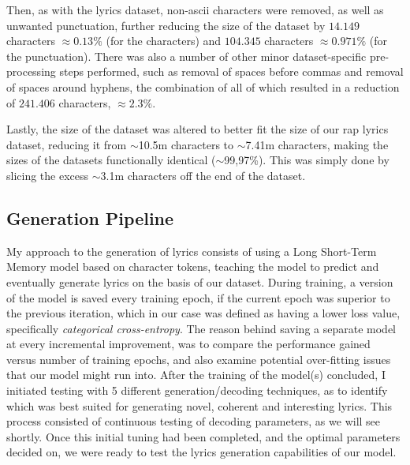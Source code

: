 Then, as with the lyrics dataset, non-ascii characters were removed, as well as unwanted punctuation, further reducing the size of the dataset by $14.149$ characters $\approx0.13\%$ (for the characters) and $104.345$ characters $\approx0.971\%$ (for the punctuation). There was also a number of other minor dataset-specific pre-processing steps performed, such as removal of spaces before commas and removal of spaces around hyphens, the combination of all of which resulted in a reduction of $241.406$ characters, $\approx2.3\%$.

Lastly, the size of the dataset was altered to better fit the size of our rap lyrics dataset, reducing it from $\sim$10.5m characters to $\sim$7.41m characters, making the sizes of the datasets functionally identical ($\sim$99,97\%). This was simply done by slicing the excess $\sim$3.1m characters off the end of the dataset.

\subsection{Generation Pipeline}
\label{sec:generation-pipeline}

My approach to the generation of lyrics consists of using a Long Short-Term Memory model based on character tokens, teaching the model to predict and eventually generate lyrics on the basis of our dataset. During training, a version of the model is saved every training epoch, if the current epoch was superior to the previous iteration, which in our case was defined as having a lower loss value, specifically \textit{categorical cross-entropy}. The reason behind saving a separate model at every incremental improvement, was to compare the performance gained versus number of training epochs, and also examine potential over-fitting issues that our model might run into.
After the training of the model(s) concluded, I initiated testing with 5 different generation/decoding techniques, as to identify which was best suited for generating novel, coherent and interesting lyrics. This process consisted of continuous testing of decoding parameters, as we will see shortly. Once this initial tuning had been completed, and the optimal parameters decided on, we were ready to test the lyrics generation capabilities of our model.


